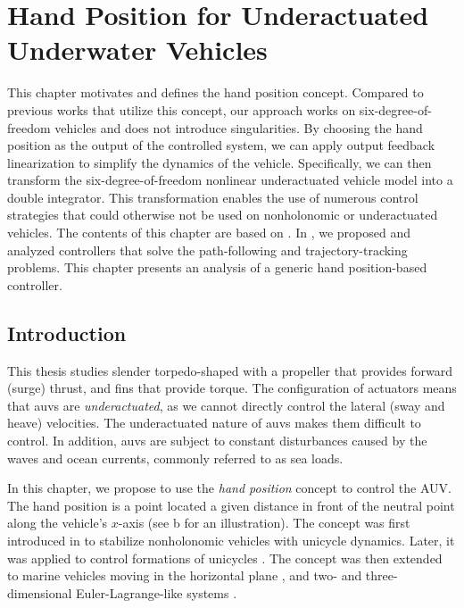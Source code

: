 \chapter{Hand Position for Underactuated Underwater Vehicles}
\label{chap:handpos_definition}

\newcommand{\LBomega}{\Bar{p}}
\newcommand{\LBnu}{\Bar{\bvel}_e}

This chapter motivates and defines the hand position concept.
Compared to previous works that utilize this concept, our approach works on six-degree-of-freedom vehicles and does not introduce singularities.
By choosing the hand position as the output of the controlled system, we can apply output feedback linearization to simplify the dynamics of the vehicle.
Specifically, we can then transform the six-degree-of-freedom nonlinear underactuated vehicle model into a double integrator.
This transformation enables the use of numerous control strategies that could otherwise not be used on nonholonomic or underactuated vehicles.
The contents of this chapter are based on \cite{matous_trajectory_2023}.
In \cite{matous_distributed_2023}, we proposed and analyzed controllers that solve the path-following and trajectory-tracking problems.
This chapter presents an analysis of a generic hand position-based controller.

\section{Introduction}

This thesis studies slender torpedo-shaped  with a propeller that provides forward (surge) thrust, and fins that provide torque.
The configuration of actuators means that \glspl{auv} are \emph{underactuated}, as we cannot directly control the lateral (sway and heave) velocities.
The underactuated nature of \glspl{auv} makes them difficult to control.
In addition, \glspl{auv} are subject to constant disturbances caused by the waves and ocean currents, commonly referred to as sea loads.

In this chapter, we propose to use the \emph{hand position} concept to control the AUV.
The hand position is a point located a given distance in front of the neutral point along the vehicle's $x$-axis (see b for an illustration).
The concept was first introduced in \cite{pomet_hand-position_1992} to stabilize nonholonomic vehicles with unicycle dynamics.
Later, it was applied to control formations of unicycles \cite{lawton_hand-position-formation_2003}.
The concept was then extended to marine vehicles moving in the horizontal plane \cite{paliotta_trajectory_2019}, and two- and three-dimensional Euler-Lagrange-like systems \cite{cai_hand-position-rigidity-planar_2015,li_hand-position-rigidity-3d_2021}.

